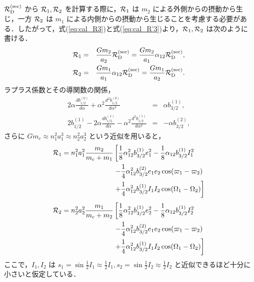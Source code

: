 \documentclass[11pt,a4paper,oneside,onecolumn]{jreport}
\begin{document}
${\cal R}_{\rm D}^{\rm (sec)}$ から ${\cal R}_1, {\cal R}_2$ を計算する際に，${\cal R}_1$ は $m_2$ による外側からの摂動から生じ，一方 ${\cal R}_2$ は $m_1$ による内側からの摂動から生じることを考慮する必要がある．したがって，式(\ref{eq:cal_R3})と式(\ref{eq:cal_R'3})より，${\cal R}_1, {\cal R}_2$ は次のように書ける．
\begin{eqnarray}
{\cal R}_1 & = & \frac{G m_2}{a_2} {\cal R}_{\rm D}^{\rm (sec)} = \frac{G m_2}{a_1} \alpha_{12} {\cal R}_{\rm D}^{\rm (sec)}, \\ \label{}
{\cal R}_2 & = & \frac{G m_1}{a_1} \alpha_{12} {\cal R}_{\rm D}^{\rm (sec)} = \frac{G m_1}{a_2} {\cal R}_{\rm D}^{\rm (sec)}. \label{}
\end{eqnarray}
ラプラス係数とその導関数の関係，
\begin{eqnarray}
2 \alpha \frac{d b_{1/2}^{(0)}}{d \alpha} + \alpha^2 \frac{d^2 b_{1/2}^{(0)}}{d \alpha^2} & = & \alpha b_{3/2}^{(1)}, \\ \label{}
2 b_{1/2}^{(1)} - 2 \alpha \frac{d b_{1/2}^{(1)}}{d \alpha} - \alpha^2 \frac{d^2 b_{1/2}^{(1)}}{d \alpha^2} & = & - \alpha b_{3/2}^{(2)}, \label{}
\end{eqnarray}
さらに $G m_c \approx n_1^2 a_1^3 \approx n_2^2 a_2^3$ という近似を用いると，
\begin{equation}
\begin{split}
{\cal R}_1 = n_1^2 a_1^2 \frac{m_2}{m_c + m_1} & \left[ \frac{1}{8} \alpha_{12}^2 b_{3/2}^{(1)} e_1^2 - \frac{1}{8} \alpha_{12} b_{3/2}^{(1)} I_1^2 \right. \\
& \left. - \frac{1}{4} \alpha_{12}^2 b_{3/2}^{(2)} e_1 e_2 \cos (\varpi_1 - \varpi_2) \right. \\
& \left. + \frac{1}{4} \alpha_{12}^2 b_{3/2}^{(1)} I_1 I_2 \cos (\Omega_1 - \Omega_2) \right] \\
\end{split} \label{}
\end{equation}
\begin{equation}
\begin{split}
{\cal R}_2 = n_2^2 a_2^2 \frac{m_1}{m_c + m_2} & \left[ \frac{1}{8} \alpha_{12}^2 b_{3/2}^{(1)} e_2^2 - \frac{1}{8} \alpha_{12} b_{3/2}^{(1)} I_2^2 \right. \\
& \left. - \frac{1}{4} \alpha_{12}^2 b_{3/2}^{(2)} e_1 e_2 \cos (\varpi_1 - \varpi_2) \right. \\
& \left. + \frac{1}{4} \alpha_{12}^2 b_{3/2}^{(1)} I_1 I_2 \cos (\Omega_1 - \Omega_2) \right] \\
\end{split} \label{}
\end{equation}
ここで，$I_1, I_2$ は $s_1 = \sin \frac{1}{2} I_1 \approx \frac{1}{2} I_1, s_2 = \sin \frac{1}{2} I_2 \approx \frac{1}{2} I_2$ と近似できるほど十分に小さいと仮定している．
\end{document}
